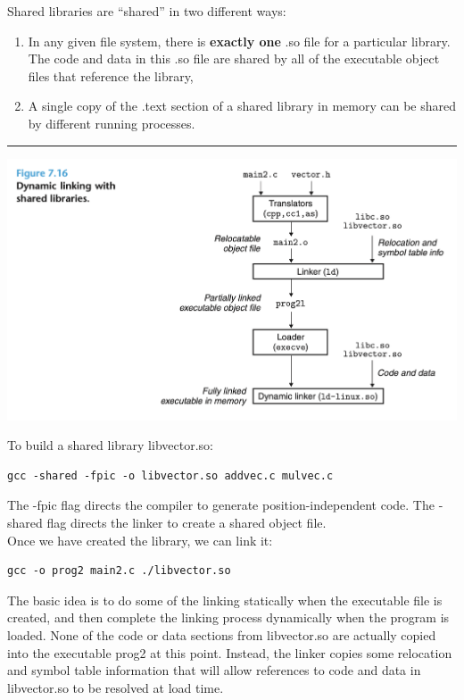 \documentclass[11pt]{article}
\begin{document}
Shared libraries are “shared” in two different ways:\\
\begin{enumerate}
\item In any given file system, there is \textbf{exactly one} .so file for a particular library. The code and data in this .so file are shared by all of the executable object files that reference the library,\\
\item A single copy of the .text section of a shared library in memory can be shared by different running processes.\\
\end{enumerate}

\noindent\rule{\textwidth}{0.5pt}

\begin{center}
\includegraphics[width=.9\linewidth]{pics/figure7.16-dynamic-linking.png}
\end{center}

To build a shared library libvector.so:\\
\begin{verbatim}
gcc -shared -fpic -o libvector.so addvec.c mulvec.c
\end{verbatim}
The -fpic flag directs the compiler to generate position-independent code. The -shared flag directs the linker to create a shared object file.\\

Once we have created the library, we can link it:\\
\begin{verbatim}
gcc -o prog2 main2.c ./libvector.so
\end{verbatim}

The basic idea is to do some of the linking statically when the executable file is created, and then complete the linking process dynamically when the program is loaded. None of the code or data sections from libvector.so are actually copied into the executable prog2 at this point. Instead, the linker copies some relocation and symbol table information that will allow references to code and data in libvector.so to be resolved at load time.\\
\end{document}
